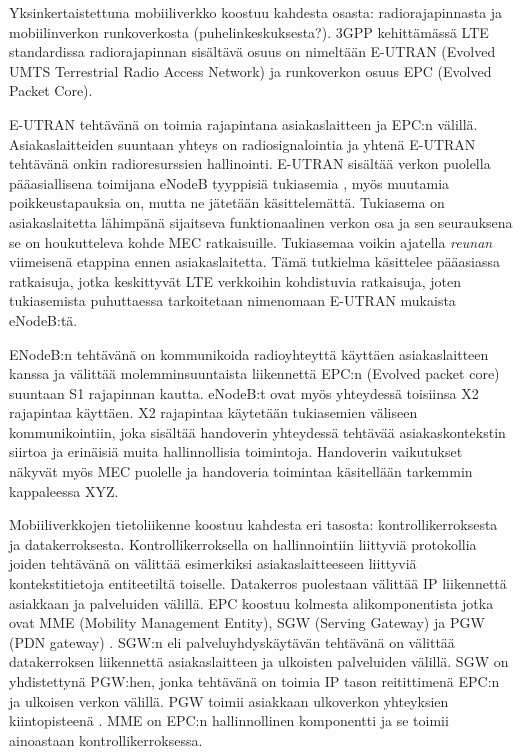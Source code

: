 \documentclass[finnish]{tktltiki2}
\theoremstyle{definition}
\theoremstyle{remark}
\begin{document}
Yksinkertaistettuna mobiiliverkko koostuu kahdesta osasta: radiorajapinnasta ja mobiilinverkon runkoverkosta (puhelinkeskuksesta?). 3GPP kehittämässä LTE standardissa radiorajapinnan sisältävä osuus on nimeltään E-UTRAN (Evolved UMTS Terrestrial Radio Access Network) ja runkoverkon osuus EPC (Evolved Packet Core).

E-UTRAN tehtävänä on toimia rajapintana asiakaslaitteen ja EPC:n välillä. Asiakaslaitteiden suuntaan yhteys on radiosignalointia ja yhtenä E-UTRAN tehtävänä onkin radioresurssien hallinointi. 
E-UTRAN sisältää verkon puolella pääasiallisena toimijana eNodeB tyyppisiä tukiasemia \cite{etsieutran}, myös muutamia poikkeustapauksia on, mutta ne jätetään käsittelemättä.
Tukiasema on asiakaslaitetta lähimpänä sijaitseva funktionaalinen verkon osa ja sen seurauksena se on houkutteleva kohde MEC ratkaisuille. Tukiasemaa voikin ajatella \textit{reunan} viimeisenä etappina ennen asiakaslaitetta. Tämä tutkielma käsittelee pääasiassa ratkaisuja, jotka keskittyvät LTE verkkoihin kohdistuvia ratkaisuja, joten tukiasemista puhuttaessa tarkoitetaan nimenomaan E-UTRAN mukaista eNodeB:tä. 

ENodeB:n tehtävänä on kommunikoida radioyhteyttä käyttäen asiakaslaitteen kanssa ja välittää molemminsuuntaista liikennettä EPC:n (Evolved packet core) suuntaan S1 rajapinnan kautta. eNodeB:t ovat myös yhteydessä toisiinsa X2 rajapintaa käyttäen. X2 rajapintaa käytetään tukiasemien väliseen kommunikointiin, joka sisältää handoverin yhteydessä tehtävää asiakaskontekstin siirtoa ja erinäisiä muita hallinnollisia toimintoja.  
Handoverin vaikutukset näkyvät myös MEC puolelle ja handoveria toimintaa käsitellään tarkemmin kappaleessa XYZ.

Mobiiliverkkojen tietoliikenne koostuu kahdesta eri tasosta: kontrollikerroksesta ja datakerroksesta.
Kontrollikerroksella on hallinnointiin liittyviä protokollia joiden tehtävänä on välittää esimerkiksi asiakaslaitteeseen liittyviä kontekstitietoja entiteetiltä toiselle. Datakerros puolestaan välittää IP liikennettä asiakkaan ja palveluiden välillä. 
EPC koostuu kolmesta alikomponentista jotka ovat MME (Mobility Management Entity), SGW (Serving Gateway) ja PGW (PDN gateway) \cite{etsilte}.
SGW:n eli palveluyhdyskäytävän tehtävänä on välittää datakerroksen liikennettä asiakaslaitteen ja ulkoisten palveluiden välillä. SGW on yhdistettynä PGW:hen, jonka tehtävänä on toimia IP tason reitittimenä EPC:n ja ulkoisen verkon välillä. PGW toimii asiakkaan ulkoverkon yhteyksien kiintopisteenä \cite{3gppepc}. MME on EPC:n hallinnollinen komponentti ja se toimii ainoastaan kontrollikerroksessa.
\end{document}
